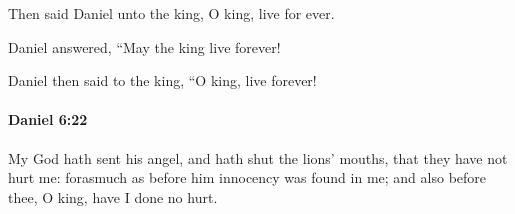 			\begin{versebox}
					\item[BHS] 
					\item[LXX] 
					\item[ASV] Then said Daniel unto the king, O king, live for ever.
					\item[NIV] Daniel answered, “May the king live forever!
					\item[NRSV] Daniel then said to the king, “O king, live forever!
			\end{versebox}

		\paragraph{Daniel 6:22} %
			\label{DANIEL-6-22}

			My God hath sent his angel, and hath shut the lions’ mouths, that they have not hurt me: forasmuch as before him innocency was found in me; and also before thee, O king, have I done no hurt.

